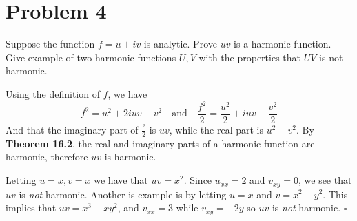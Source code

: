 \documentclass[11pt]{article}
\newenvironment{proof}{\noindent{\bf Proof.}}{\hfill $\square$\medskip}
\begin{document}
\section{Problem 4}
Suppose the function $f=u+iv$ is analytic. Prove $uv$ is a harmonic function. Give example of two harmonic functions $U,V$ with the properties that $UV$ is not harmonic.

\begin{proof}
Using the definition of $f$, we have
$$f^{2}=u^{2}+2iuv-v^{2}\quad\text{and}\quad \frac{f^{2}}{2}=\frac{u^{2}}{2}+iuv-\frac{v^{2}}{2}$$
And that the imaginary part of $\frac{^{2}}{2}$ is $uv$, while the real part is $u^{2}-v^{2}$. By 
\textbf{Theorem 16.2}, the real and imaginary parts of a harmonic function are harmonic, therefore $uv$ is harmonic.

Letting $u=x,v=x$ we have that $uv=x^{2}$. Since $u_{xx}=2$ and $v_{xy}=0$, we see that $uv$ is \textit{not} harmonic.
Another is example is by letting $u=x$ and $v=x^{2}-y^{2}$. This implies that $uv=x^{3}-xy^{2}$, and $v_{xx}=3$ while $v_{xy}=-2y$ so $uv$ is \textit{not} harmonic.
\end{proof}
\end{document}
